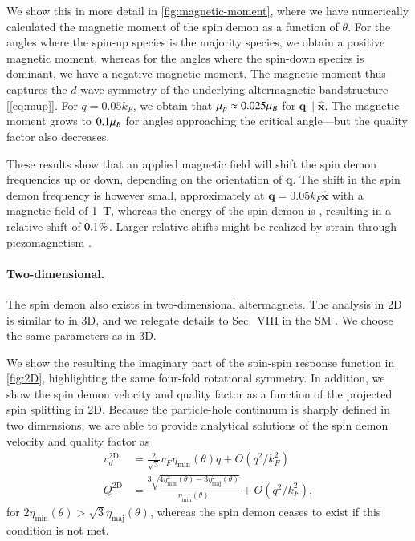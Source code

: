 \documentclass[aps,prl,reprint,twocolumns,superscriptaddress]{revtex4-2}
\newcommand{\xx}{\hat{\bm{x}}}
\newcommand{\kF}{k_{F}}
\newcommand{\vs}{v_d}
\begin{document}
	We show this in more detail in \cref{fig:magnetic-moment}, where we have numerically calculated the magnetic moment of the spin demon as a function of $\theta$. For the angles where the spin-up species is the majority species, we obtain a positive magnetic moment, whereas for the angles where the spin-down species is dominant, we have a negative magnetic moment. The magnetic moment thus captures the $d$-wave symmetry of the underlying altermagnetic bandstructure [\cref{eq:mup}]. For $q=0.05\kF$, we obtain that $\mu_p\approx0.025\mu_B$ for $\bm q\parallel \xx$. The magnetic moment grows to $0.1\mu_B$ for angles approaching the critical angle---but the quality factor also decreases. 
	
	These results show that an applied magnetic field will shift the spin demon frequencies up or down, depending on the orientation of $\bm q$. The shift in the spin demon frequency is however small, approximately \muBShift at $\bm q=0.05k_F\hat{\bm x}$ with a magnetic field of \SI{1}{T}, whereas the energy of the spin demon is \demonenergy, resulting in a relative shift of $0.1\%$. Larger relative shifts might be realized by strain through piezomagnetism \cite{aoyamaPiezomagneticPropertiesAltermagnetic2024}.
	
	
	
	
	\paragraph{Two-dimensional.}
	The spin demon also exists in two-dimensional altermagnets. The analysis in 2D is similar to in 3D, and we relegate details to Sec.~VIII in the SM \cite{Note1}. We choose the same parameters as in 3D.
	
	We show the resulting the imaginary part of the spin-spin response function in \cref{fig:2D}, highlighting the same four-fold rotational symmetry. 
	In addition, we show the spin demon velocity and quality factor as a function of the projected spin splitting in 2D. Because the particle-hole continuum is sharply defined in two dimensions,  we are able to provide analytical solutions of the spin demon velocity and quality factor as \cite{agarwalLonglivedSpinPlasmons2014}
	\begin{align}
		\vs^{\mathrm{2D}} &= \frac{2}{\sqrt{3}} v_F \eta_{\mathrm{min}}(\theta) q + O(q^2/\kF^2)\\
		Q^{\mathrm{2D}} &= \frac{3\sqrt{4\eta_{\mathrm{min}}^2(\theta)-3\eta_{\mathrm{maj}}^2(\theta)}}{\eta_{\mathrm{min}}(\theta)} + O(q^2/\kF^2),
	\end{align}
	for $2\eta_{\mathrm{min}}(\theta)>\sqrt{3}\eta_{\mathrm{maj}}(\theta)$, whereas the spin demon ceases to exist if this condition is not met. 
	
\end{document}

